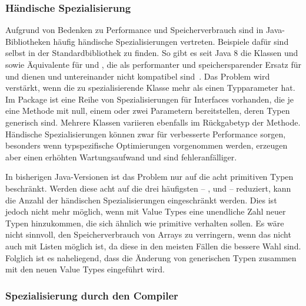 \subsubsection{Händische Spezialisierung}

Aufgrund von Bedenken zu Performance und Speicherverbrauch sind in Java-Bibliotheken häufig händische Spezialisierungen vertreten.
Beispiele dafür sind selbst in der Standardbibliothek zu finden.
So gibt es seit Java 8 die Klassen  und  sowie Äquivalente für  und , die als performanter und speichersparender Ersatz für  und  dienen und untereinander nicht kompatibel sind~\cite{java-8-docs}.
Das Problem wird verstärkt, wenn die zu spezialisierende Klasse mehr als einen Typparameter hat.
Im Package  ist eine Reihe von Spezialisierungen für Interfaces vorhanden, die je eine Methode mit null, einem oder zwei Parametern bereitstellen, deren Typen generisch sind.
Mehrere Klassen variieren ebenfalls im Rückgabetyp der Methode.
Händische Spezialisierungen können zwar für verbesserte Performance sorgen, besonders wenn typspezifische Optimierungen vorgenommen werden, erzeugen aber einen erhöhten Wartungsaufwand und sind fehleranfälliger.

In bisherigen Java-Versionen ist das Problem nur auf die acht primitiven Typen beschränkt.
Werden diese acht auf die drei häufigsten -- ,  und  -- reduziert, kann die Anzahl der händischen Spezialisierungen eingeschränkt werden.
Dies ist jedoch nicht mehr möglich, wenn mit Value Types eine unendliche Zahl neuer Typen hinzukommen, die sich ähnlich wie primitive verhalten sollen.
Es wäre nicht sinnvoll, den Speicherverbrauch von Arrays zu verringern, wenn das nicht auch mit Listen möglich ist, da diese in den meisten Fällen die bessere Wahl sind.
Folglich ist es naheliegend, dass die Änderung von generischen Typen zusammen mit den neuen Value Types eingeführt wird.

\subsubsection{Spezialisierung durch den Compiler}

